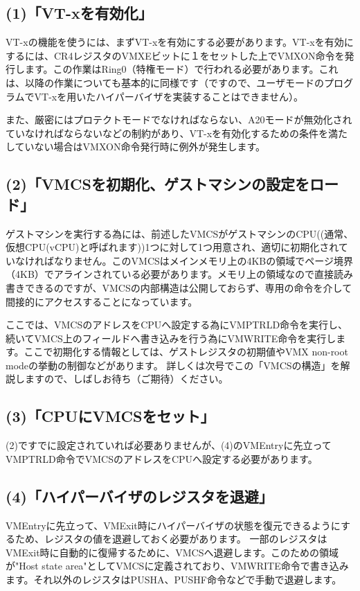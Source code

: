 \documentclass[a4j,12pt]{jarticle}
\begin{document}
\subsection*{(1)「VT-xを有効化」}
VT-xの機能を使うには、まずVT-xを有効にする必要があります。VT-xを有効にするには、CR4レジスタのVMXEビットに１をセットした上でVMXON命令を発行します。この作業はRing0（特権モード）で行われる必要があります。これは、以降の作業についても基本的に同様です（ですので、ユーザモードのプログラムでVT-xを用いたハイパーバイザを実装することはできません）。

また、厳密にはプロテクトモードでなければならない、A20モードが無効化されていなければならないなどの制約があり、VT-xを有効化するための条件を満たしていない場合はVMXON命令発行時に例外が発生します。

\subsection*{(2)「VMCSを初期化、ゲストマシンの設定をロード」}
ゲストマシンを実行する為には、前述したVMCSがゲストマシンのCPU((通常、仮想CPU(vCPU)と呼ばれます))1つに対して1つ用意され、適切に初期化されていなければなりません。このVMCSはメインメモリ上の4KBの領域でページ境界（4KB）でアラインされている必要があります。メモリ上の領域なので直接読み書きできるのですが、VMCSの内部構造は公開しておらず、専用の命令を介して間接的にアクセスすることになっています。

ここでは、VMCSのアドレスをCPUへ設定する為にVMPTRLD命令を実行し、続いてVMCS上のフィールドへ書き込みを行う為にVMWRITE命令を実行します。ここで初期化する情報としては、ゲストレジスタの初期値やVMX non-root modeの挙動の制御などがあります。
詳しくは次号でこの「VMCSの構造」を解説しますので、しばしお待ち（ご期待）ください。

\subsection*{(3)「CPUにVMCSをセット」}
(2)ですでに設定されていれば必要ありませんが、(4)のVMEntryに先立ってVMPTRLD命令でVMCSのアドレスをCPUへ設定する必要があります。

\subsection*{(4)「ハイパーバイザのレジスタを退避」}
VMEntryに先立って、VMExit時にハイパーバイザの状態を復元できるようにするため、レジスタの値を退避しておく必要があります。
一部のレジスタはVMExit時に自動的に復帰するために、VMCSへ退避します。このための領域が"Host state area"としてVMCSに定義されており、VMWRITE命令で書き込みます。それ以外のレジスタはPUSHA、PUSHF命令などで手動で退避します。
\end{document}
